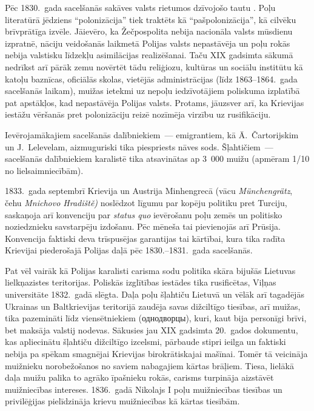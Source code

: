 \documentclass[twoside,a5paper,12pt,fleqn,openany]{extbook}
\newcommand{\rutxti}[1]{\textrussian{#1}}
\newcommand{\detxti}[1]{\textit{\textgerman{#1}}}
\newcommand{\latxti}[1]{\textit{\textlatin{#1}}}
\newcommand{\cstxti}[1]{\textit{\textczech{#1}}}
\begin{document}
Pēc 1830.~gada sacelšanās sakāves  valsts rietumos dzīvojošo tautu . Poļu literatūrā jēdziens ``polonizācija'' tiek traktēts kā ``pašpolonizācija'', kā cilvēku brīvprātīga izvēle. Jāievēro, ka Žečpospolita nebija nacionāla valsts mūsdienu izpratnē, nāciju veidošanās laikmetā Polijas valsts nepastāvēja un poļu rokās nebija valstisku līdzekļu asimilācijas realizēšanai. Taču XIX gadsimta sākumā nedrīkst arī pārāk zemu novērtēt tādu reliģiozu, kultūras un sociālu institūtu kā katoļu baznīcas, oficiālās skolas, vietējās administrācijas (līdz 1863--1864.~gada sacelšanās laikam), muižas ietekmi uz nepoļu iedzīvotājiem poliskuma izplatībā pat apstākļos, kad nepastāvēja Polijas valsts. Protams, jāuzsver arī, ka Krievijas iestāžu vēršanās pret polonizāciju reizē nozīmēja virzību uz rusifikāciju.

Ievērojamākajiem sacelšanās dalībniekiem~--- emigrantiem, kā Ā.~Čartorijskim un J.~Lelevelam, aizmuguriski tika piespriests nāves sods. Šļahtičiem~--- sacelšanās dalībniekiem karalistē tika atsavinātas ap 3~000 muižu (apmēram 1/10 no lielsaimniecībām).

1833.~gada septembrī Krievija un Austrija Minhengrecā (vācu \detxti{Münchengrätz}, čehu \cstxti{Mnichovo Hradiště)} noslēdzot līgumu par kopēju politiku pret Turciju, saskaņoja arī konvenciju par \latxti{status quo} ievērošanu poļu zemēs un politisko noziedznieku savstarpēju izdošanu. Pēc mēneša tai pievienojās arī Prūsija. Konvencija faktiski deva trīspusējas garantijas tai kārtībai, kura tika radīta Krievijai piederošajā Polijas daļā pēc 1830.--1831.~gada sacelšanās.

Pat vēl vairāk kā Polijas karalisti carisma sodu politika skāra bijušās Lietuvas lielkņazistes teritorijas. Poliskās izglītības iestādes tika rusificētas, Viļņas universitāte 1832.~gadā slēgta. Daļa poļu šļahtiču Lietuvā un vēlāk arī tagadējās Ukrainas un Baltkrievijas teritorijā zaudēja savas dižciltīgo tiesības, arī muižas, tika pazemināti līdz viensētniekiem (\rutxti{однодворцы}), kuri, kaut bija personīgi brīvi, bet maksāja valstij nodevas. Sākusies jau XIX gadsimta 20.~gados dokumentu, kas apliecinātu šļahtiču dižciltīgo izcelsmi, pārbaude stipri ieilga un faktiski nebija pa spēkam smagnējai Krievijas birokrātiskajai mašīnai. Tomēr tā veicināja muižnieku norobežošanos no saviem nabagajiem kārtas brāļiem. Tiesa, lielākā daļa muižu palika to agrāko īpašnieku rokās, carisms turpināja aizstāvēt muižniecības intereses. 1836.~gadā Nikolajs I poļu muižniecības tiesības un privilēģijas pielīdzināja krievu muižniecības kā kārtas tiesībām.
\end{document}
